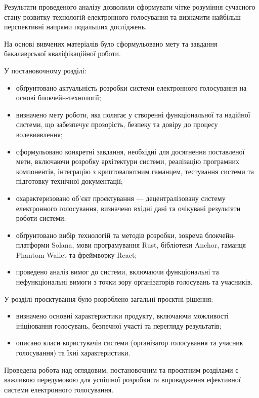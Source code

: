 \documentclass[14pt]{extreport}
\begin{document}
Результати проведеного аналізу дозволили сформувати чітке розуміння сучасного стану розвитку технологій електронного голосування та визначити найбільш перспективні напрями подальших досліджень.

На основі вивчених матеріалів було сформульовано мету та завдання бакалаврської кваліфікаційної роботи.

У постановочному розділі:

\begin{itemize}
    \item обґрунтовано актуальність розробки системи електронного голосування на основі блокчейн-технології;
    \item визначено мету роботи, яка полягає у створенні функціональної та надійної системи, що забезпечує прозорість, безпеку та довіру до процесу волевиявлення;
    \item сформульовано конкретні завдання, необхідні для досягнення поставленої мети, включаючи розробку архітектури системи, реалізацію програмних компонентів, інтеграцію з криптовалютним гаманцем, тестування системи та підготовку технічної документації;
    \item охарактеризовано об'єкт проєктування — децентралізовану систему електронного голосування, визначено вхідні дані та очікувані результати роботи системи;
    \item обґрунтовано вибір технологій та методів розробки, зокрема блокчейн-платформи Solana, мови програмування Rust, бібліотеки Anchor, гаманця Phantom Wallet та фреймворку React;
    \item проведено аналіз вимог до системи, включаючи функціональні та нефункціональні вимоги з точки зору організаторів голосувань та учасників.
\end{itemize}

У розділі проєктування було розроблено загальні проєктні рішення:

\begin{itemize}
    \item визначено основні характеристики продукту, включаючи можливості ініціювання голосувань, безпечної участі та перегляду результатів;
    \item описано класи користувачів системи (організатор голосування та учасник голосування) та їхні характеристики.
\end{itemize}

Проведена робота над оглядовим, постановочним та проєктним розділами є важливою передумовою для успішної розробки та впровадження ефективної системи електронного голосування.
\end{document}
